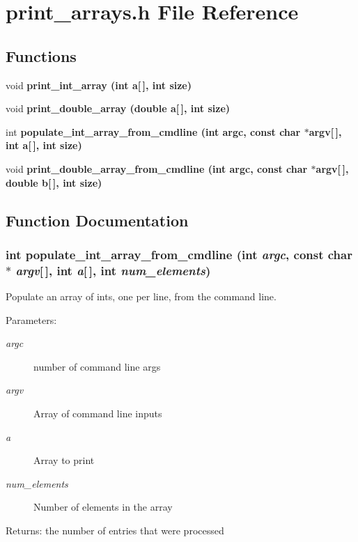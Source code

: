\section{print\_\-arrays.h File Reference}
\label{print__arrays_8h}
\subsection*{Functions}
\begin{CompactItemize}
\item 
void \bf{print\_\-int\_\-array} (int a[$\,$], int size)
\item 
void \bf{print\_\-double\_\-array} (double a[$\,$], int size)
\item 
int \bf{populate\_\-int\_\-array\_\-from\_\-cmdline} (int argc, const char $\ast$argv[$\,$], int a[$\,$], int size)
\item 
void \bf{print\_\-double\_\-array\_\-from\_\-cmdline} (int argc, const char $\ast$argv[$\,$], double b[$\,$], int size)
\end{CompactItemize}


\subsection{Function Documentation}
\subsubsection{\setlength{\rightskip}{0pt plus 5cm}int populate\_\-int\_\-array\_\-from\_\-cmdline (int {\em argc}, const char $\ast$ {\em argv}[$\,$], int {\em a}[$\,$], int {\em num\_\-elements})}\label{print__arrays_8h_8d770c399f8c14da4c823f8f9cc9fed9}


Populate an array of ints, one per line, from the command line. \begin{Desc}
\item[Parameters:]
\begin{description}
\item[{\em argc}]number of command line args \item[{\em argv}]Array of command line inputs \item[{\em a}]Array to print \item[{\em num\_\-elements}]Number of elements in the array \end{description}
\end{Desc}
\begin{Desc}
\item[Returns:]the number of entries that were processed \end{Desc}
